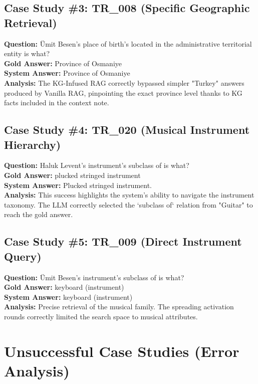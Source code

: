 \documentclass{article}
\begin{document}
\subsection{Case Study \#3: TR\_008 (Specific Geographic Retrieval)}
\textbf{Question:} Ümit Besen's place of birth's located in the administrative territorial entity is what? \\
\textbf{Gold Answer:} Province of Osmaniye \\
\textbf{System Answer:} Province of Osmaniye \\
\textbf{Analysis:} The KG-Infused RAG correctly bypassed simpler "Turkey" answers produced by Vanilla RAG, pinpointing the exact province level thanks to KG facts included in the context note.

\subsection{Case Study \#4: TR\_020 (Musical Instrument Hierarchy)}
\textbf{Question:} Haluk Levent's instrument's subclass of is what? \\
\textbf{Gold Answer:} plucked stringed instrument \\
\textbf{System Answer:} Plucked stringed instrument. \\
\textbf{Analysis:} This success highlights the system's ability to navigate the instrument taxonomy. The LLM correctly selected the `subclass of` relation from "Guitar" to reach the gold answer.

\subsection{Case Study \#5: TR\_009 (Direct Instrument Query)}
\textbf{Question:} Ümit Besen's instrument's subclass of is what? \\
\textbf{Gold Answer:} keyboard (instrument) \\
\textbf{System Answer:} keyboard (instrument) \\
\textbf{Analysis:} Precise retrieval of the musical family. The spreading activation rounds correctly limited the search space to musical attributes.

\newpage

\section{Unsuccessful Case Studies (Error Analysis)}
\end{document}
